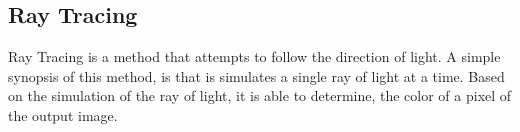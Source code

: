 \documentclass[../../main.tex]{subfiles}
\begin{document}
\subsection{Ray Tracing}%
\label{sub:ray_tracing}

Ray Tracing is a method that attempts to follow the direction of light. A
simple synopsis of this method, is that is simulates a single ray of light at a
time. Based on the simulation of the ray of light, it is able to determine, the
color of a pixel of the output image.
\end{document}
